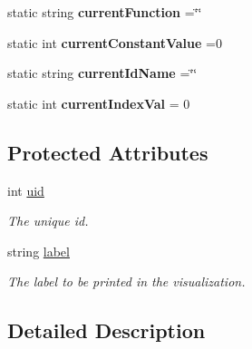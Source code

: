 \begin{DoxyCompactItemize}
\item 
\hypertarget{classAST_a5c3cc894d9c0453523dec9ed76f18a04}{static string {\bfseries current\-Function} =\char`\"{}\char`\"{}}\label{classAST_a5c3cc894d9c0453523dec9ed76f18a04}

\item 
\hypertarget{classAST_a66155513b59ff1a04c8ece8b20ec31f5}{static int {\bfseries current\-Constant\-Value} =0}\label{classAST_a66155513b59ff1a04c8ece8b20ec31f5}

\item 
\hypertarget{classAST_a3d031d7bab635ba1f015aade5943f40c}{static string {\bfseries current\-Id\-Name} =\char`\"{}\char`\"{}}\label{classAST_a3d031d7bab635ba1f015aade5943f40c}

\item 
\hypertarget{classAST_a16c4b6e54febc1a26b31a64a46972ef0}{static int {\bfseries current\-Index\-Val} = 0}\label{classAST_a16c4b6e54febc1a26b31a64a46972ef0}

\end{DoxyCompactItemize}
\subsection*{Protected Attributes}
\begin{DoxyCompactItemize}
\item 
\hypertarget{classAST_a847b778f1c3dd5a19de32de432ee6e15}{int \hyperlink{classAST_a847b778f1c3dd5a19de32de432ee6e15}{uid}}\label{classAST_a847b778f1c3dd5a19de32de432ee6e15}

\begin{DoxyCompactList}\small\item\em The unique id. \end{DoxyCompactList}\item 
\hypertarget{classAST_ab2e239ccc0688d2341724432ff5a1a31}{string \hyperlink{classAST_ab2e239ccc0688d2341724432ff5a1a31}{label}}\label{classAST_ab2e239ccc0688d2341724432ff5a1a31}

\begin{DoxyCompactList}\small\item\em The label to be printed in the visualization. \end{DoxyCompactList}\end{DoxyCompactItemize}


\subsection{Detailed Description}


